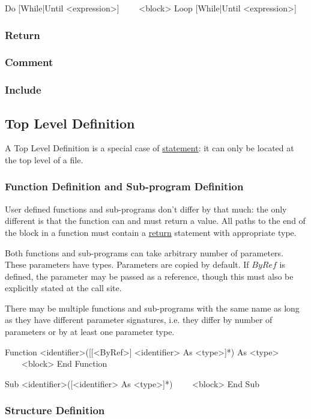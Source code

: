 \begin{grammar}%
Do [While|Until <expression>]
~~~~<block>
Loop [While|Until <expression>]
\end{grammar}

\subsubsection{Return}
\label{stat:return}

\subsubsection{Comment}
\label{stat:comment}

\subsubsection{Include}
\label{stat:include}


\subsection{Top Level Definition}
\label{tld}
A Top Level Definition is a special case of \hyperref[statement]{statement}:
it can only be located at the top level of a file.

\subsubsection{Function Definition and Sub-program Definition}
\label{tld:funcdef}
User defined functions and sub-programs don't differ by that much:
the only different is that the function can and must return a value.
All paths to the end of the block in a function must contain a \hyperref[stat:return]{return} statement
with appropriate type.

Both functions and sub-programs can take arbitrary number of parameters.
These parameters have types.
Parameters are copied by default.
If $ByRef$ is defined, the parameter may be passed as a reference,
though this must also be explicitly stated at the call site.

There may be multiple functions and sub-programs with the same name
as long as they have different parameter signatures, i.e.
they differ by number of parameters or by at least one parameter type.

\begin{grammar}%
Function <identifier>([[<ByRef>] <identifier> As <type>]*) As <type>
~~~~<block>
End Function

Sub <identifier>([<identifier> As <type>]*)
~~~~<block>
End Sub
\end{grammar}


\subsubsection{Structure Definition}
\label{tld:structdef}
